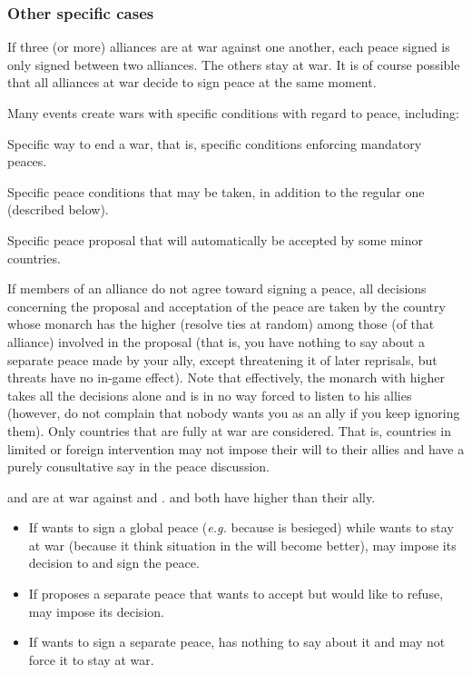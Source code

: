 \subsubsection{Other specific cases}
\bparag If three (or more) alliances are at war against one another, each
peace signed is only signed between two alliances. The others stay at war.
\bparag It is of course possible that all alliances at war decide to sign
peace at the same moment.

\bparag Many events create wars with specific conditions with regard to peace,
including:
\begin{modlist}
  \item Specific way to end a war, that is, specific conditions enforcing
    mandatory peaces.
  \item Specific peace conditions that may be taken, in addition to the
    regular one (described below).
  \item Specific peace proposal that will automatically be accepted by some
    minor countries.
\end{modlist}

\aparag[Disagreements]
\bparag If members of an alliance do not agree toward signing a peace, all
decisions concerning the proposal and acceptation of the peace are taken by
the country whose monarch has the higher \DIP (resolve ties at random) among
those (of that alliance) involved in the proposal (that is, you have nothing
to say about a separate peace made by your ally, except threatening it of
later reprisals, but threats have no in-game effect).
\bparag Note that effectively, the monarch with higher \DIP takes all the
decisions alone and is in no way forced to listen to his allies (however, do
not complain that nobody wants you as an ally if you keep ignoring them).
\bparag Only countries that are fully at war are considered. That is,
countries in limited or foreign intervention may not impose their will to
their allies and have a purely consultative say in the peace discussion. 

\begin{exemple}[Disagreements]
  \FRA and \SPA are at war against \HOL and \ANG. \FRA and  \HOL both have
  higher \DIP than their ally.
  \begin{itemize}
  \item If \HOL wants to sign a global peace (\emph{e.g.} because
    \villeAmsterdam is besieged) while \ANG wants to stay at war (because it
    think situation in the \ROTW will become better), \HOL may impose its
    decision to \ANG and sign the peace.
  \item If \HOL proposes a separate peace that \FRA wants to accept but \HIS
    would like to refuse, \FRA may impose its decision.
  \item If \ANG wants to sign a separate peace, \HOL has nothing to say about
    it and may not force it to stay at war.
  \end{itemize}
\end{exemple}

